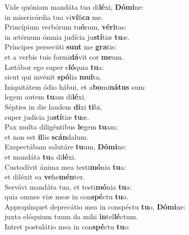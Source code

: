 \oddverse Vide quóniam mandáta tua di\textbf{lé}xi, \textbf{Dó}\textbf{mi}ne:~\*\\
\oddverse in misericórdia tua vi\textbf{ví}fi\textbf{ca} me.\\
\evenverse Princípium verbórum tu\textbf{ó}rum, \textbf{vé}\textbf{ri}tas:~\*\\
\evenverse in ætérnum ómnia judícia ju\textbf{stí}tiæ \textbf{tu}æ.\\
\oddverse Príncipes persecúti \textbf{sunt} me \textbf{gra}tis:~\*\\
\oddverse et a verbis tuis formi\textbf{dá}vit cor \textbf{me}um.\\
\evenverse Lætábor ego super e\textbf{ló}quia \textbf{tu}a:~\*\\
\evenverse sicut qui invénit \textbf{spó}lia \textbf{mul}ta.\\
\oddverse Iniquitátem ódio hábui, et a\textbf{bo}mi\textbf{ná}\textbf{tus} sum:~\*\\
\oddverse legem autem \textbf{tu}am di\textbf{lé}xi.\\
\evenverse Sépties in die laudem \textbf{di}xi \textbf{ti}bi,~\*\\
\evenverse super judícia ju\textbf{stí}tiæ \textbf{tu}æ.\\
\oddverse Pax multa diligéntibus \textbf{le}gem \textbf{tu}am:~\*\\
\oddverse et non est \textbf{il}lis \textbf{scán}dalum.\\
\evenverse Exspectábam salutáre \textbf{tu}um, \textbf{Dó}\textbf{mi}ne:~\*\\
\evenverse et mandáta \textbf{tu}a di\textbf{lé}xi.\\
\oddverse Custodívit ánima mea testi\textbf{mó}nia \textbf{tu}a:~\*\\
\oddverse et diléxit ea \textbf{ve}he\textbf{mén}ter.\\
\evenverse Servávi mandáta tua, et testi\textbf{mó}nia \textbf{tu}a:~\*\\
\evenverse quia omnes viæ meæ in con\textbf{spé}ctu \textbf{tu}o.\\
\oddverse Appropínquet deprecátio mea in conspéctu \textbf{tu}o, \textbf{Dó}\textbf{mi}ne:~\*\\
\oddverse juxta elóquium tuum da mihi \textbf{in}tel\textbf{lé}ctum.\\
\evenverse Intret postulátio mea in con\textbf{spé}ctu \textbf{tu}o:~\*\\
